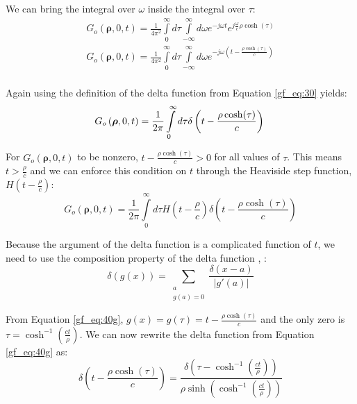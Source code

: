 \noindent We can bring the integral over $\omega$ inside the integral over $\tau$:
\begin{equation}
\begin{gathered}
G_o\left(\boldsymbol{\rho},0,t\right) = \frac{1}{4\pi^2}\int\limits_{0}^{\infty}d\tau\int\limits_{-\infty}^{\infty}d\omega e^{-j\omega t} e^{j\frac{\omega}{c}\rho\cosh(\tau)}\\
G_o\left(\boldsymbol{\rho},0,t\right) = \frac{1}{4\pi^2}\int\limits_{0}^{\infty}d\tau\int\limits_{-\infty}^{\infty}d\omega e^{-j\omega \left(t - \frac{\rho \cosh(\tau)}{c} \right)}\\
\end{gathered}
\label{gf_eq:40e}
\end{equation}
\renewcommand{\baselinestretch}{2} \small\normalsize

\noindent Again using the definition of the delta function from Equation \ref{gf_eq:30} yields:
\begin{equation}
G_o\left(\boldsymbol{\rho},0,t\right) = \frac{1}{2\pi}\int\limits_{0}^{\infty}d\tau \delta\left(t - \frac{\rho \cosh(\tau)}{c}\right)\\
\label{gf_eq:40f}
\end{equation}
\renewcommand{\baselinestretch}{2} \small\normalsize

For $G_o\left(\boldsymbol{\rho},0,t\right)$ to be nonzero, $t - \frac{\rho \cosh(\tau)}{c} > 0$ for all values of $\tau$. This means $t > \frac{\rho}{c}$ and we can enforce this condition on $t$ through the Heaviside step function, $H\left(t -\frac{\rho}{c}\right)$:
 \begin{equation}
G_o\left(\boldsymbol{\rho},0,t\right) = \frac{1}{2\pi}\int\limits_{0}^{\infty}d\tau H\left(t -\frac{\rho}{c}\right) \delta\left(t - \frac{\rho \cosh(\tau)}{c}\right)
\label{gf_eq:40g}
\end{equation}
 \renewcommand{\baselinestretch}{2} \small\normalsize
 
Because the argument of the delta function is a complicated function of $t$, we need to use the composition property of the delta function \cite{arfken_weber}, \cite{gbur_math}:
 \begin{equation}
\delta\left(g(x) \right) = \sum_{\substack{a \\g(a)=0}}\frac{\delta(x-a)}{|g'(a)|}
\label{gf_eq:40h}
\end{equation}
 \renewcommand{\baselinestretch}{2} \small\normalsize
 
From Equation \ref{gf_eq:40g}, $g(x) = g(\tau) = t - \frac{\rho\cosh(\tau)}{c}$ and the only zero  is $\tau = \cosh^{-1}\left(\frac{ct}{\rho}\right)$. We can now rewrite the delta function from Equation \ref{gf_eq:40g} as:
 \begin{equation}
\delta\left(t - \frac{\rho \cosh(\tau)}{c}\right) = \frac{\delta\left(\tau -\cosh^{-1}\left(\frac{ct}{\rho} \right) \right)}{\rho\sinh\left(\cosh^{-1}\left(\frac{ct}{\rho} \right) \right)}
\label{gf_eq:40i}
\end{equation}
 \renewcommand{\baselinestretch}{2} \small\normalsize
 
